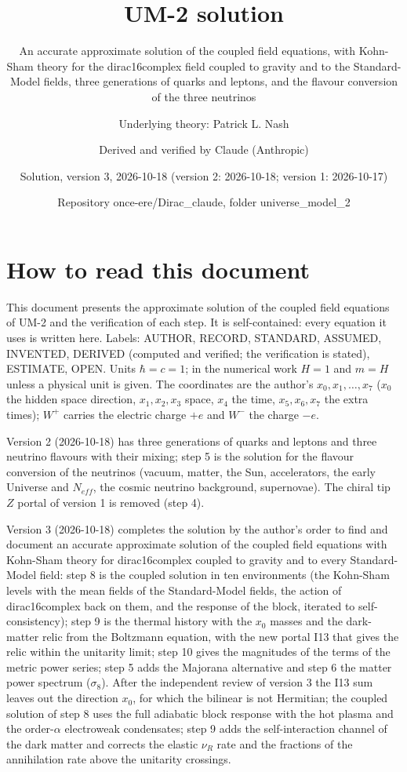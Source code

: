 \documentclass[
  10pt,
]{article}
\title{UM-2 solution}
\subtitle{An accurate approximate solution of the coupled field
equations, with Kohn-Sham theory for the dirac16complex field coupled to
gravity and to the Standard-Model fields, three generations of quarks
and leptons, and the flavour conversion of the three neutrinos}
\author{Underlying theory: Patrick L. Nash \and Derived and verified by
Claude (Anthropic) \and Solution, version 3, 2026-10-18 (version 2:
2026-10-18; version 1: 2026-10-17) \and Repository
once-ere/Dirac\_claude, folder universe\_model\_2}
\date{}
\begin{document}
\maketitle

{
\hypersetup{linkcolor=}
\setcounter{tocdepth}{3}
\tableofcontents
}
\hypertarget{how-to-read-this-document}{%
\section{How to read this document}\label{how-to-read-this-document}}

This document presents the approximate solution of the coupled field
equations of UM-2 and the verification of each step. It is
self-contained: every equation it uses is written here. Labels: AUTHOR,
RECORD, STANDARD, ASSUMED, INVENTED, DERIVED (computed and verified; the
verification is stated), ESTIMATE, OPEN. Units \(\hbar = c = 1\); in the
numerical work \(H = 1\) and \(m = H\) unless a physical unit is given.
The coordinates are the author's \(x_0, x_1, \dots, x_7\) (\(x_0\) the
hidden space direction, \(x_1, x_2, x_3\) space, \(x_4\) the time,
\(x_5, x_6, x_7\) the extra times); \(W^+\) carries the electric charge
\(+e\) and \(W^-\) the charge \(-e\).

Version 2 (2026-10-18) has three generations of quarks and leptons and
three neutrino flavours with their mixing; step 5 is the solution for
the flavour conversion of the neutrinos (vacuum, matter, the Sun,
accelerators, the early Universe and \(N_{eff}\), the cosmic neutrino
background, supernovae). The chiral tip \(Z\) portal of version 1 is
removed (step 4).

Version 3 (2026-10-18) completes the solution by the author's order to
find and document an accurate approximate solution of the coupled field
equations with Kohn-Sham theory for dirac16complex coupled to gravity
and to every Standard-Model field: step 8 is the coupled solution in ten
environments (the Kohn-Sham levels with the mean fields of the
Standard-Model fields, the action of dirac16complex back on them, and
the response of the block, iterated to self-consistency); step 9 is the
thermal history with the \(x_0\) masses and the dark-matter relic from
the Boltzmann equation, with the new portal I13 that gives the relic
within the unitarity limit; step 10 gives the magnitudes of the terms of
the metric power series; step 5 adds the Majorana alternative and step 6
the matter power spectrum (\(\sigma_8\)). After the independent review
of version 3 the I13 sum leaves out the direction \(x_0\), for which the
bilinear is not Hermitian; the coupled solution of step 8 uses the full
adiabatic block response with the hot plasma and the order-\(\alpha\)
electroweak condensates; step 9 adds the self-interaction channel of the
dark matter and corrects the elastic \(\nu_R\) rate and the fractions of
the annihilation rate above the unitarity crossings.
\end{document}

